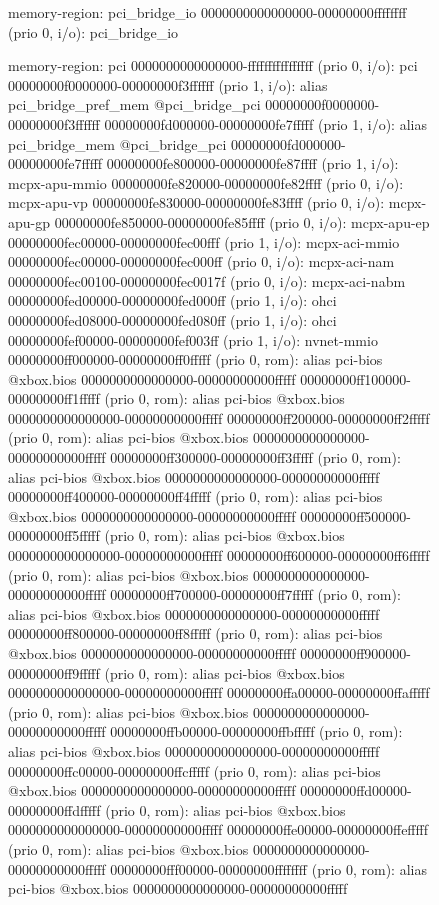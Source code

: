 \begin{figure}
\begin{minipage}{0.48\linewidth}
\begin{ffcode}
    memory-region: pci_bridge_io
      0000000000000000-00000000ffffffff (prio 0, i/o): pci_bridge_io

    memory-region: pci
      0000000000000000-ffffffffffffffff (prio 0, i/o): pci
        00000000f0000000-00000000f3ffffff (prio 1, i/o): alias pci_bridge_pref_mem @pci_bridge_pci 00000000f0000000-00000000f3ffffff
        00000000fd000000-00000000fe7fffff (prio 1, i/o): alias pci_bridge_mem @pci_bridge_pci 00000000fd000000-00000000fe7fffff
        00000000fe800000-00000000fe87ffff (prio 1, i/o): mcpx-apu-mmio
          00000000fe820000-00000000fe82ffff (prio 0, i/o): mcpx-apu-vp
          00000000fe830000-00000000fe83ffff (prio 0, i/o): mcpx-apu-gp
          00000000fe850000-00000000fe85ffff (prio 0, i/o): mcpx-apu-ep
        00000000fec00000-00000000fec00fff (prio 1, i/o): mcpx-aci-mmio
          00000000fec00000-00000000fec000ff (prio 0, i/o): mcpx-aci-nam
          00000000fec00100-00000000fec0017f (prio 0, i/o): mcpx-aci-nabm
        00000000fed00000-00000000fed000ff (prio 1, i/o): ohci
        00000000fed08000-00000000fed080ff (prio 1, i/o): ohci
        00000000fef00000-00000000fef003ff (prio 1, i/o): nvnet-mmio
        00000000ff000000-00000000ff0fffff (prio 0, rom): alias pci-bios @xbox.bios 0000000000000000-00000000000fffff
        00000000ff100000-00000000ff1fffff (prio 0, rom): alias pci-bios @xbox.bios 0000000000000000-00000000000fffff
        00000000ff200000-00000000ff2fffff (prio 0, rom): alias pci-bios @xbox.bios 0000000000000000-00000000000fffff
        00000000ff300000-00000000ff3fffff (prio 0, rom): alias pci-bios @xbox.bios 0000000000000000-00000000000fffff
        00000000ff400000-00000000ff4fffff (prio 0, rom): alias pci-bios @xbox.bios 0000000000000000-00000000000fffff
        00000000ff500000-00000000ff5fffff (prio 0, rom): alias pci-bios @xbox.bios 0000000000000000-00000000000fffff
        00000000ff600000-00000000ff6fffff (prio 0, rom): alias pci-bios @xbox.bios 0000000000000000-00000000000fffff
        00000000ff700000-00000000ff7fffff (prio 0, rom): alias pci-bios @xbox.bios 0000000000000000-00000000000fffff
        00000000ff800000-00000000ff8fffff (prio 0, rom): alias pci-bios @xbox.bios 0000000000000000-00000000000fffff
        00000000ff900000-00000000ff9fffff (prio 0, rom): alias pci-bios @xbox.bios 0000000000000000-00000000000fffff
        00000000ffa00000-00000000ffafffff (prio 0, rom): alias pci-bios @xbox.bios 0000000000000000-00000000000fffff
        00000000ffb00000-00000000ffbfffff (prio 0, rom): alias pci-bios @xbox.bios 0000000000000000-00000000000fffff
        00000000ffc00000-00000000ffcfffff (prio 0, rom): alias pci-bios @xbox.bios 0000000000000000-00000000000fffff
        00000000ffd00000-00000000ffdfffff (prio 0, rom): alias pci-bios @xbox.bios 0000000000000000-00000000000fffff
        00000000ffe00000-00000000ffefffff (prio 0, rom): alias pci-bios @xbox.bios 0000000000000000-00000000000fffff
        00000000fff00000-00000000ffffffff (prio 0, rom): alias pci-bios @xbox.bios 0000000000000000-00000000000fffff


\end{ffcode}
\end{minipage}
\end{figure}
